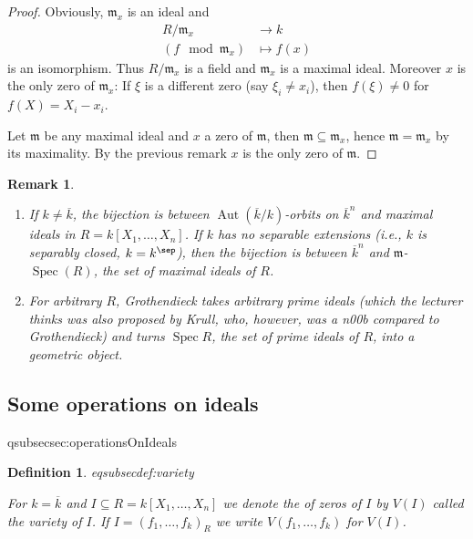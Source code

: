 \documentclass[DIV=14,parskip=full,pointednumbers]{scrartcl}
\newenvironment{alphanumerate}{\begin{enumerate}[label={\upshape(\alph*)},ref=\curthm]}{\end{enumerate}}
\theoremstyle{cthm}
\theoremstyle{cvarthm}
\theoremstyle{cdef}
\newtheorem{defi}{Definition}[subsection]
\newtheorem{rem}{Remark}[subsection]
\newcommand{\lbl}[1]{
	\label{#1}
	\ifmmode
	\expandafter\xdef\csname eqsubsec#1\endcsname{\thesubsection}
	\fi
}
\newcommand{\mm}{\mathfrak{m}}
\newcommand{\Aut}{\operatorname{Aut}}
\newcommand{\longto}{\longrightarrow}
\begin{document}
	\begin{proof}
		Obviously, $\mm_x$ is an ideal and
		\begin{align*}
		R/\mm_x &\longto k\\
		(f\mod \mm_x) &\longmapsto f(x)
		\end{align*}
		is an isomorphism. Thus $R/\mm_x$ is a field and $\mm_x$ is a maximal ideal. Moreover $x$ is the only zero of $\mm_x$: If $\xi$ is a different zero (say $\xi_i\neq x_i$), then $f(\xi)\neq 0$ for $f(X) = X_i-x_i$.
		
		Let $\mm$ be any maximal ideal and $x$ a zero of $\mm$, then $\mm\subseteq\mm_x$, hence $\mm=\mm_x$ by its maximality. By the previous remark $x$ is the only zero of $\mm$.
	\end{proof}
	\begin{rem}
		\begin{alphanumerate}
			\item If $k\neq\overline{k}$, the bijection is between $\Aut(\overline{k}/k)$-orbits on $\overline{k}^n$ and maximal ideals in $R=k[X_1,\ldots,X_n]$. If $k$ has no separable extensions (i.e., $k$ is \emph{separably closed}, $k=k^{\sep}$), then the bijection is between $\overline{k}^n$ and $\mm$-$\operatorname{Spec}(R)$, the set of maximal ideals of $R$.
			\item For arbitrary $R$, Grothendieck takes arbitrary prime ideals (which the lecturer thinks was also proposed by Krull, who, however, was a \emph{n00b} compared to Grothendieck) and turns $\operatorname{Spec} R$, the set of prime ideals of $R$, into a geometric object.
		\end{alphanumerate}
		
	\end{rem}
	
	
	\subsection{Some operations on ideals}\lbl{sec:operationsOnIdeals}
	\begin{defi}\lbl{def:variety}
		For $k=\overline{k}$ and $I\subseteq R = k[X_1,\ldots,X_n]$ we denote the of zeros of $I$ by $V(I)$ called the \emph{variety} of $I$. If $I=(f_1,\ldots,f_k)_R$ we write $V(f_1,\ldots,f_k)$ for $V(I)$.
	\end{defi}
	
\end{document}
